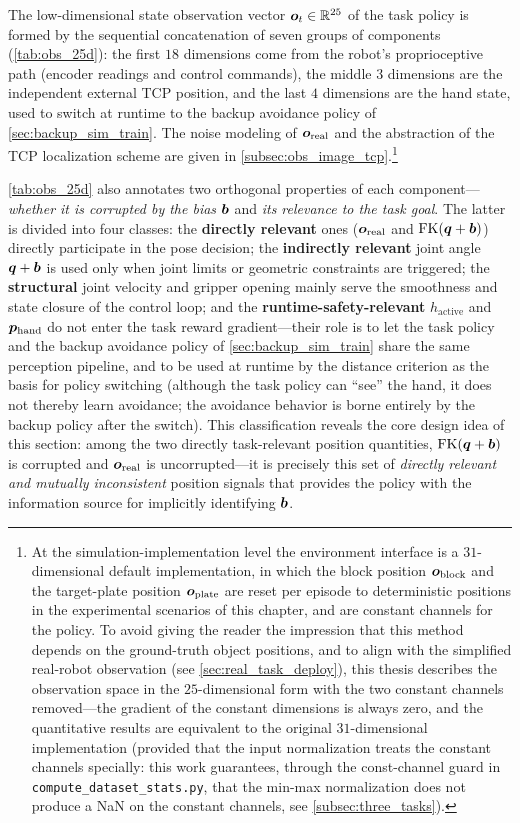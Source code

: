 The low-dimensional state observation vector $\bm{o}_t \in \mathbb{R}^{25}$ of the task policy is formed by the sequential concatenation of seven groups of components (\cref{tab:obs_25d}): the first $18$ dimensions come from the robot's proprioceptive path (encoder readings and control commands), the middle $3$ dimensions are the independent external TCP position, and the last $4$ dimensions are the hand state, used to switch at runtime to the backup avoidance policy of \cref{sec:backup_sim_train}. The noise modeling of $\bm{o}_\text{real}$ and the abstraction of the TCP localization scheme are given in \cref{subsec:obs_image_tcp}.\footnote{At the simulation-implementation level the environment interface is a $31$-dimensional default implementation, in which the block position $\bm{o}_\text{block}$ and the target-plate position $\bm{o}_\text{plate}$ are reset per episode to deterministic positions in the experimental scenarios of this chapter, and are constant channels for the policy. To avoid giving the reader the impression that this method depends on the ground-truth object positions, and to align with the simplified real-robot observation (see \cref{sec:real_task_deploy}), this thesis describes the observation space in the $25$-dimensional form with the two constant channels removed---the gradient of the constant dimensions is always zero, and the quantitative results are equivalent to the original $31$-dimensional implementation (provided that the input normalization treats the constant channels specially: this work guarantees, through the const-channel guard in \texttt{compute\_dataset\_stats.py}, that the min-max normalization does not produce a NaN on the constant channels, see \cref{subsec:three_tasks}).}

\cref{tab:obs_25d} also annotates two orthogonal properties of each component---\emph{whether it is corrupted by the bias $\bm{b}$} and \emph{its relevance to the task goal}. The latter is divided into four classes: the \textbf{directly relevant} ones ($\bm{o}_\text{real}$ and $\text{FK}(\bm{q}+\bm{b})$) directly participate in the pose decision; the \textbf{indirectly relevant} joint angle $\bm{q}+\bm{b}$ is used only when joint limits or geometric constraints are triggered; the \textbf{structural} joint velocity and gripper opening mainly serve the smoothness and state closure of the control loop; and the \textbf{runtime-safety-relevant} $h_\text{active}$ and $\bm{p}_\text{hand}$ do not enter the task reward gradient---their role is to let the task policy and the backup avoidance policy of \cref{sec:backup_sim_train} share the same perception pipeline, and to be used at runtime by the distance criterion as the basis for policy switching (although the task policy can ``see'' the hand, it does not thereby learn avoidance; the avoidance behavior is borne entirely by the backup policy after the switch). This classification reveals the core design idea of this section: among the two directly task-relevant position quantities, $\text{FK}(\bm{q}+\bm{b})$ is corrupted and $\bm{o}_\text{real}$ is uncorrupted---it is precisely this set of \emph{directly relevant and mutually inconsistent} position signals that provides the policy with the information source for implicitly identifying $\bm{b}$.

